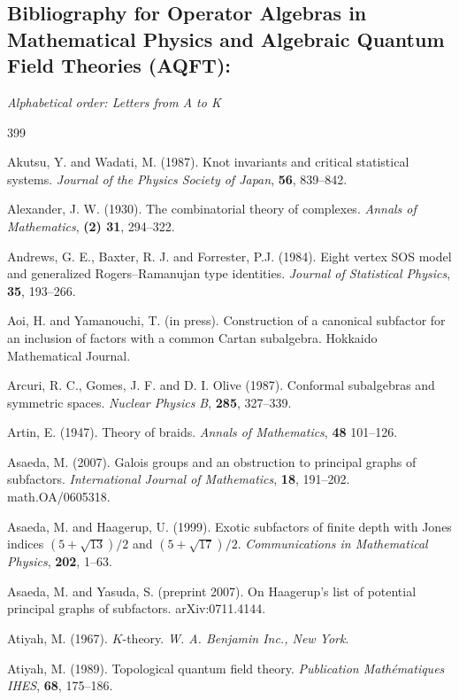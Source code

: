 \documentclass[12pt]{article}
\theoremstyle{plain}
\theoremstyle{definition}
\numberwithin{equation}{section}
\begin{document}
\subsection{Bibliography for Operator Algebras in Mathematical Physics and Algebraic Quantum Field Theories (AQFT):}
\emph{Alphabetical order: Letters from A to K}

\begin{thebibliography} {399}

Akutsu, Y. and Wadati, M. (1987).
Knot invariants and critical statistical systems.
{\em Journal of the Physics Society of Japan},
{\bf 56}, 839--842.

Alexander, J. W. (1930).
The combinatorial theory of complexes.
{\em Annals of Mathematics}, {\bf (2) 31}, 294--322.

Andrews, G. E., Baxter, R. J. and Forrester, P.J. (1984).
Eight vertex SOS model and generalized
Rogers--Ramanujan type identities. {\em Journal of Statistical Physics},  {\bf 35}, 193--266.

Aoi, H. and Yamanouchi, T. (in press).
Construction of a canonical subfactor for an inclusion of factors with a common Cartan subalgebra.
{\rm Hokkaido Mathematical Journal}.

Arcuri, R. C., Gomes, J. F. and D. I. Olive (1987). Conformal subalgebras and symmetric spaces.
{\em Nuclear Physics B}, {\bf 285}, 327--339.

Artin, E. (1947). Theory of braids. {\em Annals of Mathematics},
{\bf 48} 101--126.

Asaeda, M. (2007). Galois groups and an obstruction to principal graphs of subfactors.
{\em International Journal of Mathematics}, {\bf 18}, 191--202.
math.OA/0605318.

Asaeda, M. and Haagerup, U. (1999). Exotic subfactors of finite depth with Jones indices
${(5+\sqrt{13})}/{2}$ and ${(5+\sqrt{17})}/{2}$. {\em Communications in Mathematical Physics},
{\bf 202}, 1--63.

Asaeda, M. and Yasuda, S. (preprint 2007). On Haagerup's list of potential principal graphs of subfactors.
arXiv:0711.4144.

Atiyah, M. (1967). $K$-theory. {\em W. A. Benjamin Inc., New York}.

Atiyah, M. (1989). Topological quantum field theory. {\em Publication Math\'ematiques IHES},
{\bf 68}, 175--186.


\end{thebibliography}
\end{document}
